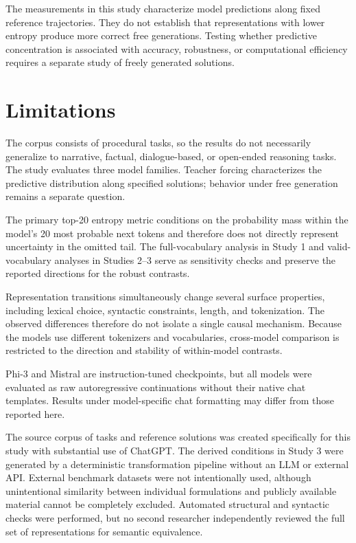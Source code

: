 \documentclass[sn-mathphys-num]{sn-jnl}
\begin{document}
The measurements in this study characterize model predictions along fixed reference trajectories. They do not establish that representations with lower entropy produce more correct free generations. Testing whether predictive concentration is associated with accuracy, robustness, or computational efficiency requires a separate study of freely generated solutions.

\section{Limitations}

The corpus consists of procedural tasks, so the results do not necessarily generalize to narrative, factual, dialogue-based, or open-ended reasoning tasks. The study evaluates three model families. Teacher forcing characterizes the predictive distribution along specified solutions; behavior under free generation remains a separate question.

The primary top-20 entropy metric conditions on the probability mass within the model's 20 most probable next tokens and therefore does not directly represent uncertainty in the omitted tail. The full-vocabulary analysis in Study 1 and valid-vocabulary analyses in Studies 2--3 serve as sensitivity checks and preserve the reported directions for the robust contrasts.

Representation transitions simultaneously change several surface properties, including lexical choice, syntactic constraints, length, and tokenization. The observed differences therefore do not isolate a single causal mechanism. Because the models use different tokenizers and vocabularies, cross-model comparison is restricted to the direction and stability of within-model contrasts.

Phi-3 and Mistral are instruction-tuned checkpoints, but all models were evaluated as raw autoregressive continuations without their native chat templates. Results under model-specific chat formatting may differ from those reported here.

The source corpus of tasks and reference solutions was created specifically for this study with substantial use of ChatGPT. The derived conditions in Study 3 were generated by a deterministic transformation pipeline without an LLM or external API. External benchmark datasets were not intentionally used, although unintentional similarity between individual formulations and publicly available material cannot be completely excluded. Automated structural and syntactic checks were performed, but no second researcher independently reviewed the full set of representations for semantic equivalence.
\end{document}
